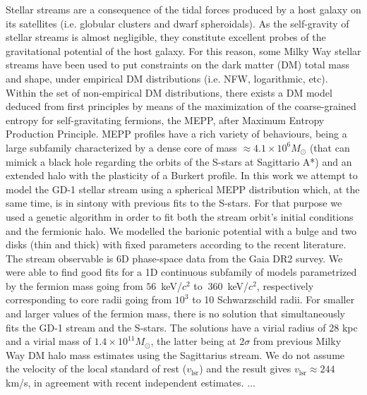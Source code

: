 \documentclass[twocolumn]{aa}
\begin{document}
  \abstract
   {Stellar streams are a consequence of the tidal forces produced by a host galaxy on its satellites (i.e. globular clusters and dwarf spheroidals).
   As the self-gravity of stellar streams is almost negligible, they constitute excellent probes of the gravitational potential of the host galaxy. For this reason, some Milky Way stellar streams have been used to put constraints on the dark matter (DM) total mass and shape, under empirical DM distributions (i.e. NFW, logarithmic, etc). Within the set of non-empirical DM distributions, there exists a DM model
   deduced from first principles by means of the maximization of the coarse-grained entropy for self-gravitating fermions, the MEPP, after Maximum Entropy Production Principle. MEPP profiles have a rich
   variety of behaviours, being a large subfamily characterized by a dense core of mass
   $\approx4.1\times10^6 M_\odot$ (that can mimick a black hole regarding the orbits of the S-stars at Sagittario A*) and an extended halo with the plasticity of a Burkert profile.}
   {In this work we attempt to model the GD-1 stellar stream using a spherical MEPP distribution which, at the same time, is in sintony with previous fits to the S-stars.}
   {For that purpose we used a genetic algorithm in order to fit both the stream orbit's initial conditions and the fermionic halo. We modelled the barionic potential with a bulge and two disks (thin and thick) with fixed parameters according to the recent literature. The stream observable is 6D phase-space data from the Gaia DR2 survey.}
   {We were able to find good fits for a 1D continuous subfamily of models parametrized by the fermion
   mass going from $56$~keV/$c^2$ to $~360$~keV/$c^2$, respectively corresponding to core radii going from
   $10^3$ to 10 Schwarzschild radii. For smaller and larger values of the fermion mass, there is no solution that simultaneously fits the GD-1 stream and the S-stars. The solutions have a virial radius of 28 kpc and a virial mass of $1.4\times10^{11} M_\odot$, the latter being at $2\sigma$ from previous Milky Way DM halo mass estimates using the Sagittarius stream. We do not assume the velocity of the local standard of rest ($v_\mathrm{lsr}$) and the result gives $v_\mathrm{lsr}\approx244$ km/s, in agreement with recent independent estimates.}
   {$\dots$}

\end{document}
